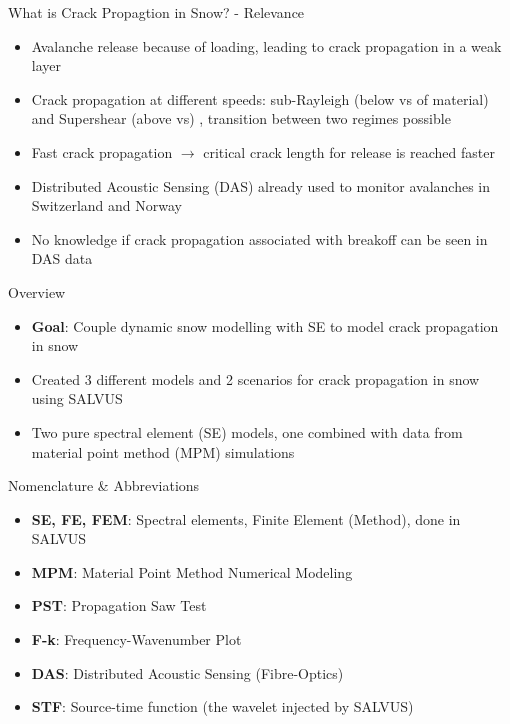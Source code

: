 \documentclass[11pt,aspectratio=169]{beamer}
\begin{document}
\begin{frame}{What is Crack Propagtion in Snow? - Relevance}
\begin{itemize}
    \item Avalanche release because of loading, leading to crack propagation in a weak layer \parencite{gaumeSnowFractureRelation2017a}
    \item Crack propagation at different speeds: sub-Rayleigh (below vs of material) and Supershear (above vs) \parencite{trottetTransitionSubRayleighAnticrack2022}, transition between two regimes possible \parencite{bergfeldSignaturesSubRayleighSupershear2025}
        \item Fast crack propagation $\rightarrow$ critical crack length for release \parencite{gaumeModelingCrackPropagation2015} is reached faster \break
        \item Distributed Acoustic Sensing (DAS) already used to monitor avalanches in Switzerland \parencite{paitzPhenomenologyAvalancheRecordings2023,edmeFiberopticDetectionSnow2023} and Norway \parencite{turquetAutomatedSnowAvalanche2024}
        \item No knowledge if crack propagation associated with breakoff can be seen in DAS data
\end{itemize}
\end{frame}

\begin{frame}{Overview}
    \begin{itemize} 
        \item \textbf{Goal}: Couple dynamic snow modelling with SE to model crack propagation in snow \break
        \item Created 3 different models and 2 scenarios for crack propagation in snow using SALVUS
        \item Two pure spectral element (SE) models, one combined with data from material point method (MPM) simulations
       
    \end{itemize}
    
\end{frame}

\begin{frame}{Nomenclature \& Abbreviations}
    \begin{itemize}
        \item \textbf{SE, FE, FEM}: Spectral elements, Finite Element (Method), done in SALVUS
        \item \textbf{MPM}: Material Point Method Numerical Modeling %
        \item \textbf{PST}: Propagation Saw Test
        \item \textbf{F-k}: Frequency-Wavenumber Plot
        \item \textbf{DAS}: Distributed Acoustic Sensing (Fibre-Optics) %
        \item \textbf{STF}: Source-time function (the wavelet injected by SALVUS)
    \end{itemize}
    
\end{frame}
\end{document}
